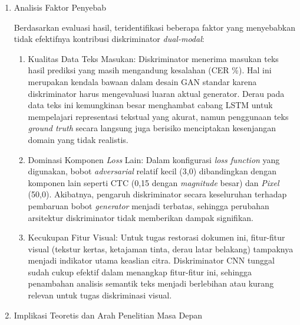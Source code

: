 \documentclass[12pt,a4paper]{article}
\begin{document}
\begin{enumerate}[leftmargin=1.5em, labelsep=0.5em, itemindent=0pt, noitemsep, topsep=0pt]
          Temuan ini menegaskan bahwa dalam konteks restorasi dokumen dengan karakteristik \textit{dataset} dan konfigurasi pelatihan yang digunakan, diskriminator visual (CNN) sudah memadai untuk membedakan citra asli dan hasil restorasi. Informasi tekstual yang diharapkan dapat membantu proses diskriminasi terbukti tidak memberikan dampak yang berarti pada hasil akhir.

    \item Analisis Faktor Penyebab

          Berdasarkan evaluasi hasil, teridentifikasi beberapa faktor yang menyebabkan tidak efektifnya kontribusi diskriminator \textit{dual-modal}:
          \begin{enumerate}[leftmargin=1.5em, labelsep=0.5em, itemindent=0pt, noitemsep, topsep=0pt, label=\alph*.]

              \item Kualitas Data Teks Masukan: Diskriminator menerima masukan teks hasil prediksi yang masih mengandung kesalahan (CER \%). Hal ini merupakan kendala bawaan dalam desain GAN standar karena diskriminator harus mengevaluasi luaran aktual generator. Derau pada data teks ini kemungkinan besar menghambat cabang LSTM untuk mempelajari representasi tekstual yang akurat, namun penggunaan teks \textit{ground truth} secara langsung juga berisiko menciptakan kesenjangan domain yang tidak realistis.

              \item Dominasi Komponen \textit{Loss} Lain: Dalam konfigurasi \textit{loss function} yang digunakan, bobot \textit{adversarial} relatif kecil (3,0) dibandingkan dengan komponen lain seperti CTC (0,15 dengan \textit{magnitude} besar) dan \textit{Pixel} (50,0). Akibatnya, pengaruh diskriminator secara keseluruhan terhadap pembaruan bobot \textit{generator} menjadi terbatas, sehingga perubahan arsitektur diskriminator tidak memberikan dampak signifikan.

              \item Kecukupan Fitur Visual: Untuk tugas restorasi dokumen ini, fitur-fitur visual (tekstur kertas, ketajaman tinta, derau latar belakang) tampaknya menjadi indikator utama keaslian citra. Diskriminator CNN tunggal sudah cukup efektif dalam menangkap fitur-fitur ini, sehingga penambahan analisis semantik teks menjadi berlebihan atau kurang relevan untuk tugas diskriminasi visual.
          \end{enumerate}

    \item Implikasi Teoretis dan Arah Penelitian Masa Depan


\end{enumerate}
\end{document}
